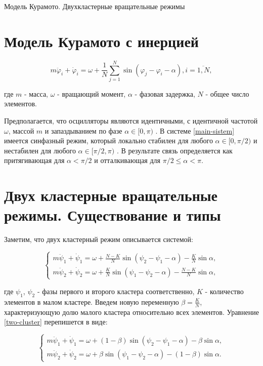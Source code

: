 \begin{chapter}{Модель Курамото. Двухкластерные вращательные режимы}
	\section{Модель Курамото с инерцией}

	\begin{equation} \label{main-sistem}
		m\ddot{\varphi}_i + \dot{\varphi}_i = \omega + 
		\frac{1}{N} \sum_{j = 1}^N \sin{(\varphi_j - 
		\varphi_i - \alpha)}, i = \overline{1, N}, 
	\end{equation}
	
	где $m$ - масса, $\omega$ - вращающий момент,
	$\alpha$ - фазовая задержка, $N$ - общее число элементов.

	Предполагается, что осцилляторы являются идентичными, с идентичной частотой $\omega$, массой $m$ и запаздыванием по
	фазе $\alpha \in [0, \pi)$ \cite{Sakaguchi} . В системе \ref{main-sistem} имеется синфазный режим, который локально стабилен для любого $\alpha \in [0, \pi/2)$
	и нестабилен для любого $\alpha \in [\pi/2, \pi)$ \cite{Acebron:Bonilla}. В результате связь определяется как
	притягивающая для $\alpha < \pi/2$ и отталкивающая для $\pi/2 \leq \alpha < \pi$.

	\section{Двух кластерные вращательные режимы. Существование и типы}
	
	Заметим, что двух кластерный режим описывается системой:
	
	\begin{equation} \label{two-cluster}
		\begin{cases}
			m\ddot{\psi}_1 + \dot{\psi}_1 = \omega + \frac{N-K}{N} \sin{(\psi_2 - \psi_1 - \alpha)} - \frac{K}{N}\sin{\alpha},\\
			m\ddot{\psi}_2 + \dot{\psi}_2 = \omega + \frac{K}{N} \sin{(\psi_1 - \psi_2 - \alpha)} - \frac{N - K}{N}\sin{\alpha},
		\end{cases}
	\end{equation}
	
	где $\psi_1$, $\psi_2$ - фазы первого и
	второго кластера соответственно, $K$ - количество элементов в малом кластере.
	Введем новую переменную $\beta = \frac{K}{N}$, характеризующую долю малого кластера относительно всех элементов. 
	Уравнение \ref{two-cluster} перепишется в виде:
	
	\begin{equation} \label{two-cluster-beta}
		\begin{cases}
			m\ddot{\psi}_1 + \dot{\psi}_1 = \omega + (1 - \beta) \sin{(\psi_2 - \psi_1 - \alpha)} - \beta\sin{\alpha}, \\
			m\ddot{\psi}_2 + \dot{\psi}_2 = \omega + \beta \sin{(\psi_1 - \psi_2 - \alpha)} - (1 - \beta)\sin{\alpha}.
		\end{cases}
	\end{equation}
	

\end{chapter}
